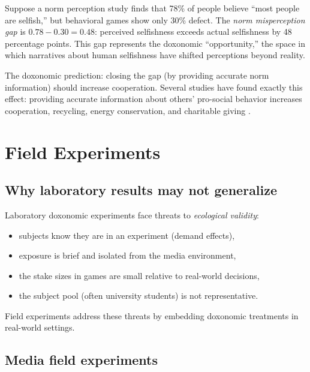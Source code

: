 \begin{example}
\label{ex:norm-gap}
Suppose a norm perception study finds that 78\% of people believe ``most people are selfish,'' but behavioral games show only 30\% defect.
The \emph{norm misperception gap} is $0.78 - 0.30 = 0.48$: perceived selfishness exceeds actual selfishness by 48 percentage points.
This gap represents the doxonomic ``opportunity,'' the space in which narratives about human selfishness have shifted perceptions beyond reality.

The doxonomic prediction: closing the gap (by providing accurate norm information) should increase cooperation.
Several studies have found exactly this effect: providing accurate information about others' pro-social behavior increases cooperation, recycling, energy conservation, and charitable giving \autocite{cialdini2006}.
\end{example}

\section{Field Experiments}
\label{sec:ch19-field}

\subsection{Why laboratory results may not generalize}

Laboratory doxonomic experiments face threats to \emph{ecological validity}:
\begin{itemize}[nosep]
  \item subjects know they are in an experiment (demand effects),
  \item exposure is brief and isolated from the media environment,
  \item the stake sizes in games are small relative to real-world decisions,
  \item the subject pool (often university students) is not representative.
\end{itemize}

Field experiments address these threats by embedding doxonomic treatments in real-world settings.

\subsection{Media field experiments}

